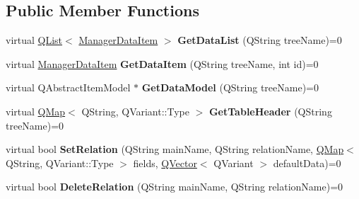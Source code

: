\subsection*{Public Member Functions}
\begin{DoxyCompactItemize}
\item 
\mbox{\label{class_i_extendable_data_base_manager_plugin_aeda41c0d78e0a702e589844a934a815c}} 
virtual \hyperlink{class_q_list}{Q\+List}$<$ \hyperlink{class_i_extendable_data_base_manager_plugin_1_1_manager_data_item}{Manager\+Data\+Item} $>$ {\bfseries Get\+Data\+List} (Q\+String tree\+Name)=0
\item 
\mbox{\label{class_i_extendable_data_base_manager_plugin_a14c965c1f955f76bd370478211d58e22}} 
virtual \hyperlink{class_i_extendable_data_base_manager_plugin_1_1_manager_data_item}{Manager\+Data\+Item} {\bfseries Get\+Data\+Item} (Q\+String tree\+Name, int id)=0
\item 
\mbox{\label{class_i_extendable_data_base_manager_plugin_ad0b28da100d3ebecb874b0ff6c6db9aa}} 
virtual Q\+Abstract\+Item\+Model $\ast$ {\bfseries Get\+Data\+Model} (Q\+String tree\+Name)=0
\item 
\mbox{\label{class_i_extendable_data_base_manager_plugin_ae19dc8759c078506e5ae18e6f946930f}} 
virtual \hyperlink{class_q_map}{Q\+Map}$<$ Q\+String, Q\+Variant\+::\+Type $>$ {\bfseries Get\+Table\+Header} (Q\+String tree\+Name)=0
\item 
\mbox{\label{class_i_extendable_data_base_manager_plugin_a744d2dd52fe84cf8ad3b67b43639030d}} 
virtual bool {\bfseries Set\+Relation} (Q\+String main\+Name, Q\+String relation\+Name, \hyperlink{class_q_map}{Q\+Map}$<$ Q\+String, Q\+Variant\+::\+Type $>$ fields, \hyperlink{class_q_vector}{Q\+Vector}$<$ Q\+Variant $>$ default\+Data)=0
\item 
\mbox{\label{class_i_extendable_data_base_manager_plugin_af0b43211e9399964c707ac337c219f8d}} 
virtual bool {\bfseries Delete\+Relation} (Q\+String main\+Name, Q\+String relation\+Name)=0
\item 

\end{DoxyCompactItemize}
